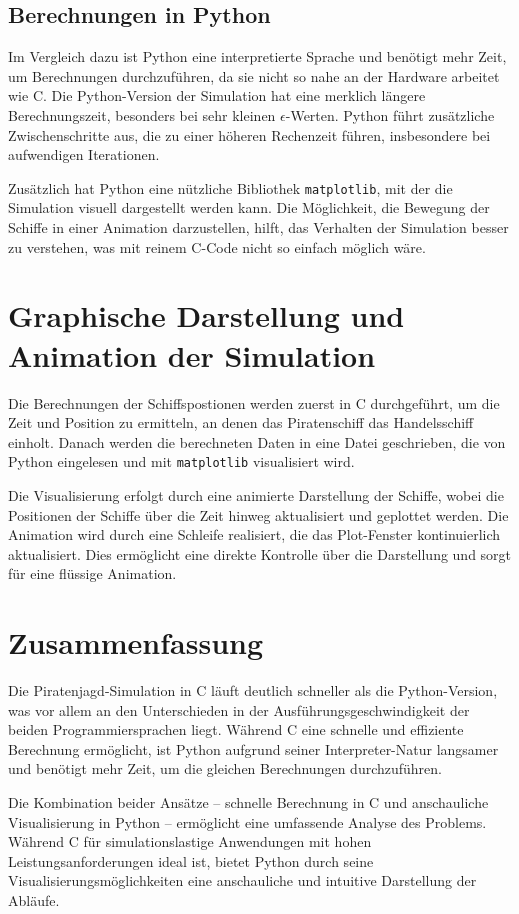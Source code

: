 \documentclass[10pt]{article} %
\begin{document}
\subsection{Berechnungen in Python}
Im Vergleich dazu ist Python eine interpretierte Sprache und benötigt mehr Zeit, um Berechnungen durchzuführen, da sie nicht so nahe an der Hardware arbeitet wie C. Die Python-Version der Simulation hat eine merklich längere Berechnungszeit, besonders bei sehr kleinen \( \epsilon \)-Werten. Python führt zusätzliche Zwischenschritte aus, die zu einer höheren Rechenzeit führen, insbesondere bei aufwendigen Iterationen.

Zusätzlich hat Python eine nützliche Bibliothek \texttt{matplotlib}, mit der die Simulation visuell dargestellt werden kann. Die Möglichkeit, die Bewegung der Schiffe in einer Animation darzustellen, hilft, das Verhalten der Simulation besser zu verstehen, was mit reinem C-Code nicht so einfach möglich wäre.

\section{Graphische Darstellung und Animation der Simulation}
Die Berechnungen der Schiffspostionen werden zuerst in C durchgeführt, um die Zeit und Position zu ermitteln, an denen das Piratenschiff das Handelsschiff einholt. Danach werden die berechneten Daten in eine Datei geschrieben, die von Python eingelesen und mit \texttt{matplotlib} visualisiert wird.

Die Visualisierung erfolgt durch eine animierte Darstellung der Schiffe, wobei die Positionen der Schiffe über die Zeit hinweg aktualisiert und geplottet werden. Die Animation wird durch eine Schleife realisiert, die das Plot-Fenster kontinuierlich aktualisiert. Dies ermöglicht eine direkte Kontrolle über die Darstellung und sorgt für eine flüssige Animation.

\section{Zusammenfassung}
Die Piratenjagd-Simulation in C läuft deutlich schneller als die Python-Version, was vor allem an den Unterschieden in der Ausführungsgeschwindigkeit der beiden Programmiersprachen liegt. Während C eine schnelle und effiziente Berechnung ermöglicht, ist Python aufgrund seiner Interpreter-Natur langsamer und benötigt mehr Zeit, um die gleichen Berechnungen durchzuführen. 

Die Kombination beider Ansätze – schnelle Berechnung in C und anschauliche Visualisierung in Python – ermöglicht eine umfassende Analyse des Problems. Während C für simulationslastige Anwendungen mit hohen Leistungsanforderungen ideal ist, bietet Python durch seine Visualisierungsmöglichkeiten eine anschauliche und intuitive Darstellung der Abläufe.
\end{document}
